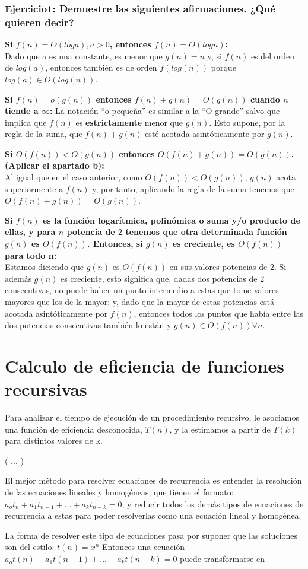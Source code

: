 \documentclass[a4paper, 11pt]{article}
\begin{document}
\subsubsection{Ejercicio1: Demuestre las siguientes afirmaciones. ¿Qué quieren decir?}
\textbf{Si $f(n) = O(log a), a > 0$, entonces $f(n) = O(log n)$:} 
\\Dado que a es una constante, es menor que $g(n)=n$ y, si $f(n)$ es del orden de $log(a)$, entonces también es de orden $f(log(n))$ porque $log(a) \in O(log(n))$. 

\textbf{Si $f(n) = o(g(n))$ entonces $f(n) + g(n) = O(g(n))$ cuando $n$ tiende a $\infty$:}
La notación ``o pequeña'' es similar a la ``O grande'' salvo que implica que $f(n)$ es \textbf{estrictamente} menor que $g(n)$. Esto supone, por la regla de la suma, que $f(n) + g(n)$ esté acotada asintóticamente por $g(n)$. 

\textbf{Si $O(f(n)) < O(g(n))$ entonces $O(f(n) + g(n)) = O(g(n))$. (Aplicar el apartado b):}
\\Al igual que en el caso anterior, como $O(f(n)) < O(g(n))$, $g(n)$ acota superiormente a $f(n)$ y, por tanto, aplicando la regla de la suma tenemos que $O(f(n) + g(n)) = O(g(n))$. 

\textbf{Si $f(n)$ es la función logarítmica, polinómica o suma y/o producto de ellas, y para $n
$	potencia de $2$ tenemos que otra determinada función $g(n)$ es $O(f(n))$. Entonces, si $g(n)$
	es creciente, es $O(f(n))$ para todo n:}
\\Estamos diciendo que $g(n)$ es $O(f(n))$ en sus valores potencias de $2$. Si además $g(n)$ es creciente, esto significa que, dadas dos potencias de $2$ consecutivas, no puede haber un punto intermedio a estas que tome valores mayores que los de la mayor; y, dado que la mayor de estas potencias está acotada asintóticamente por $f(n)$, entonces todos los puntos que había entre las dos potencias consecutivas también lo están y $g(n) \in O(f(n)) \forall n $. 


	 
\section{Calculo de eficiencia de funciones recursivas}
Para analizar el tiempo de ejecución de un procedimiento recursivo,  le asociamos una función de eficiencia desconocida, $T(n)$, y la estimamos a partir de $T(k)$ para distintos valores de k. 

( ... )

El mejor método para resolver ecuaciones de recurrencia es entender la resolución de las ecuaciones lineales y homogéneas, que tienen el formato: $a_ot_n+a_1t_{n-1}+...+a_kt_{n-k}=0$, y reducir todos los demás tipos de ecuaciones de recurrencia a estas para poder resolverlas como una ecuación lineal y homogénea.

La forma de resolver este tipo de ecuaciones pasa por suponer que las soluciones son del estilo: $t(n)=x^n$ 
Entonces una ecuación $a_ot(n)+a_1t(n-1)+...+a_kt(n-k)=0$ puede transformarse en

%




 
\end{document}
